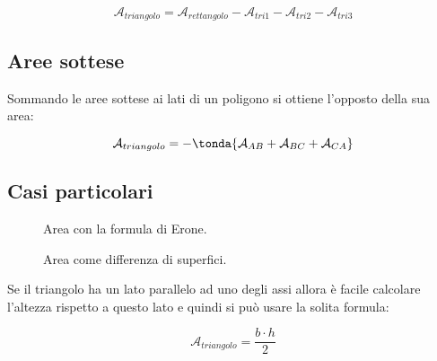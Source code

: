 \[\mathcal{A}_{triangolo} = \mathcal{A}_{rettangolo}-\mathcal{A}_{tri1}
                                                    -\mathcal{A}_{tri2}
                                                    -\mathcal{A}_{tri3}\]

\subsection*{Aree sottese}
Sommando le aree sottese ai lati di un poligono si ottiene l'opposto della 
sua area:

\[\mathcal{A}_{triangolo} = -\tonda{\mathcal{A}_{AB} + 
                            \mathcal{A}_{BC} +
                            \mathcal{A}_{CA}}\]

\subsection*{Casi particolari}

\begin{inaccessibleblock}
 \begin{figure}[h]
 \centering
 \begin{minipage}[t]{.45\textwidth}
  \centering \triangoloparallelox
  \caption{Area con la formula di Erone.}\label{fig:triangoloparallelox}
 \end{minipage}\hfil
 \begin{minipage}[t]{.45\textwidth}
    \centering \triangoloparalleloy
  \caption{Area come differenza di superfici.}\label{fig:triangoloparalleloy}
 \end{minipage}\hfil
\end{figure}
\end{inaccessibleblock}

Se il triangolo ha un lato parallelo ad uno degli assi allora è facile 
calcolare l'altezza rispetto a questo lato e quindi si può usare la 
solita formula:

\[\mathcal{A}_{triangolo} = \frac{b \cdot h}{2}\]

